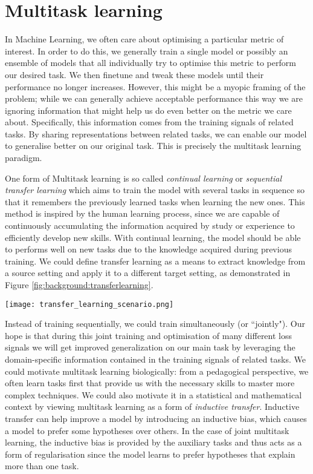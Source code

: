 {{\section{Multitask learning} \label{section:background:multitask}
In Machine Learning, we often care about optimising a particular metric of interest. In order to do this, we generally train a single model or possibly an ensemble of models that all individually try to optimise this metric to perform our desired task. We then finetune and tweak these models until their performance no longer increases. However, this might be a myopic framing of the problem; while we can generally achieve acceptable performance this way we are ignoring information that might help us do even better on the metric we care about. Specifically, this information comes from the training signals of related tasks. By sharing representations between related tasks, we can enable our model to generalise better on our original task. This is precisely the multitask learning paradigm.

One form of Multitask learning is so called \textit{continual learning} or \textit{sequential transfer learning} \cite{Parisi2018, RuderThesis} which aims to train the model with several tasks in sequence so that it remembers the previously learned tasks when learning the new ones. This method is inspired by the human learning process, since we are capable of continuously accumulating the information acquired by study or experience to efficiently develop new skills. With continual learning, the model should be able to performs well on new tasks due to the knowledge acquired during previous training. We could define transfer learning as a means to extract knowledge from a source setting and apply it to a different target setting, as demonstrated in Figure \ref{fig:background:transferlearning}.
\begin{center}
	\texttt{[image: transfer\_learning\_scenario.png]}
	\label{fig:background:transferlearning}
\end{center}

Instead of training sequentially, we could train simultaneously (or ``jointly"). Our hope is that during this joint training and optimisation of many different loss signals we will get improved generalization on our main task by leveraging the domain-specific information contained in the training signals of related tasks. We could motivate multitask learning biologically: from a pedagogical perspective, we often learn tasks first that provide us with the necessary skills to master more complex techniques. We could also motivate it in a statistical and mathematical context by viewing multitask learning as a form of \textit{inductive transfer}. Inductive transfer can help improve a model by introducing an inductive bias, which causes a model to prefer some hypotheses over others. In the case of joint multitask learning, the inductive bias is provided by the auxiliary tasks and thus acts as a form of regularisation since the model learns to prefer hypotheses that explain more than one task.

}}
